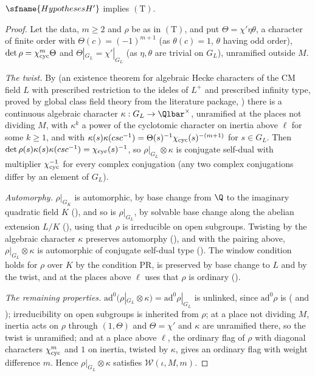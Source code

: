 \begin{proposition}\label{pf:eis:propT}
$\sfname{HypothesesH'}$ implies $(\mathrm{T})$.
\end{proposition}

\begin{proof}
Let the data, $m\ge2$ and $\rho$ be as in $(\mathrm{T})$, and put $\Theta=\chi'\eta\theta$, a character of finite order with $\Theta(c)=(-1)^{m+1}$ (as
$\theta(c)=1$, $\theta$ having odd order), $\det\rho=\chi_{\mathrm{cyc}}^m\Theta$ and $\Theta|_{G_L}=\chi'|_{G_L}$ (as $\eta,\theta$ are trivial on $G_L$), unramified
outside $M$.

\emph{The twist.} By  (an existence theorem for algebraic Hecke characters of the CM field $L$
with prescribed restriction to the ideles of $L^+$ and prescribed infinity type, proved by global class field theory from the literature
package, ) there is a continuous algebraic character $\kappa:G_L\to\Qlbar^\times$, unramified at
the places not dividing $M$, with $\kappa^k$ a power of the cyclotomic character on inertia above $\ell$ for some $k\ge1$, and with
$\kappa(s)\kappa(csc^{-1})=\Theta(s)^{-1}\chi_{\mathrm{cyc}}(s)^{-(m+1)}$ for $s\in G_L$. Then $\det\rho(s)\kappa(s)\kappa(csc^{-1})=\chi_{\mathrm{cyc}}(s)^{-1}$, so
$\rho|_{G_L}\otimes\kappa$ is conjugate self-dual with multiplier $\chi_{\mathrm{cyc}}^{-1}$ for every complex conjugation (any two complex conjugations
differ by an element of $G_L$).

\emph{Automorphy.} $\rho|_{G_K}$ is automorphic, by base change from $\Q$ to the imaginary quadratic field $K$
(), and so is $\rho|_{G_L}$, by solvable base change along the abelian extension
$L/K$ (), using that $\rho$ is irreducible on open subgroups. Twisting by the algebraic character
$\kappa$ preserves automorphy (), and with the pairing above,
$\rho|_{G_L}\otimes\kappa$ is automorphic of conjugate self-dual type
(). The window condition holds for $\rho$ over $K$ by the
condition $\mathrm{PR}$, is preserved by base change to $L$ and by the twist, and at the places above $\ell$ uses that $\rho$ is ordinary
().

\emph{The remaining properties.} $\mathrm{ad}^0(\rho|_{G_L}\otimes\kappa)=\mathrm{ad}^0\rho|_{G_L}$ is unlinked, since $\mathrm{ad}^0\rho$ is
( and ); irreducibility on open subgroups is inherited
from $\rho$; at a place not dividing $M$, inertia acts on $\rho$ through $(1,\Theta)$ and $\Theta=\chi'$ and $\kappa$ are unramified there, so the twist
is unramified; and at a place above $\ell$, the ordinary flag of $\rho$ with diagonal characters $\chi_{\mathrm{cyc}}^m$ and $1$ on inertia, twisted by $\kappa$,
gives an ordinary flag with weight difference $m$. Hence $\rho|_{G_L}\otimes\kappa$ satisfies $\mathcal W(\iota,M,m)$.
\end{proof}

